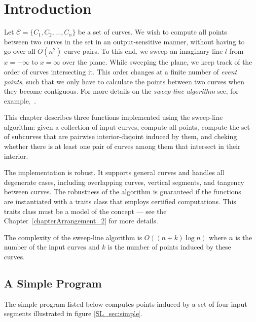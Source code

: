 \section{Introduction}

Let ${\mathcal C} = \{C_1, C_2, \ldots, C_n\}$ be a set of curves.
We wish to compute all  points between
two curves in the set in an output-sensitive manner, without having to
go over all $O(n^2)$ curve pairs. To this end, we sweep an imaginary line $l$
from $x = -\infty$ to $x = \infty$ over the plane. While sweeping
the plane, we keep track of the order of curves intersecting it.
This order changes at a finite number of \emph{event points}, such that
we only have to calculate the  points
between two curves when they become contiguous. For more details on the
\emph{sweep-line algorithm} see, for example,~\cite[Chapter~2]{bkos-cgaa-00}.

This chapter describes three functions implemented using the sweep-line
algorithm: given a collection of input curves, compute all  points,
compute the set of subcurves that are pairwise interior-disjoint induced by them,
and cheking whether there is at least one pair of curves among them that intersect in their interior.

The implementation is robust. It supports general
curves and handles all degenerate cases, including overlapping curves,
vertical segments, and tangency between curves. The robustness of the
algorithm is guaranteed if the functions are instantiated with a traits
class that employs certified computations. This traits class must be a model
of the  concept --- see the
Chapter~\ref{chapterArrangement_2} for more details.

The complexity of the sweep-line algorithm is $O((n + k)\log{n})$ where $n$
is the  number of the input curves and $k$ is the number of
 points induced by these curves.

\subsection{A Simple Program}
The simple program listed below computes  points induced by 
a set of four input segments illustrated in figure \ref{SL_sec:simple}.

